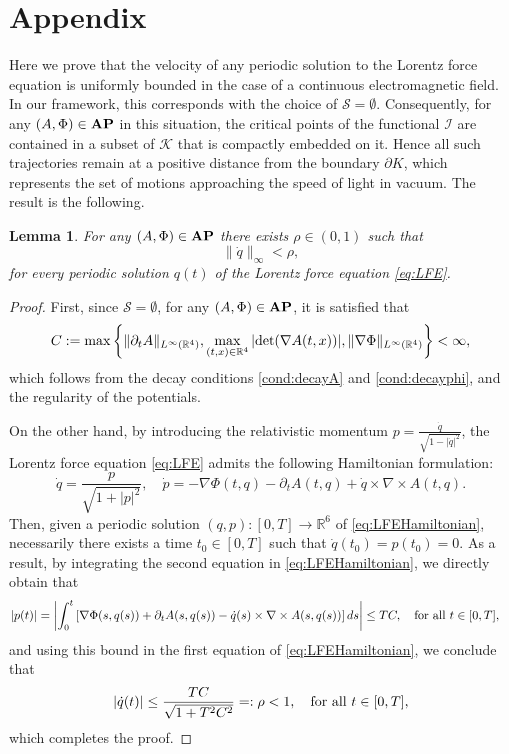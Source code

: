 \documentclass{article}
\newcommand{\boK}{\mathcal{K}}
\newcommand{\boI}{\mathcal{I}}
\newcommand{\R}{\mathbb{R}}
\newcommand{\boS}{\mathcal{S}}
\newcommand{\dq}{\dot{q}}
\newcommand{\dpp}{\dot{p}}
\newcommand{\AP}{\textnormal{\textbf{AP}}}
\newtheorem{lemma}{Lemma}[section]
\theoremstyle{definition}
\begin{document}
\appendix
\section{Appendix}\label{appendix-lemma}
Here we prove that the velocity of any periodic solution to the Lorentz force equation is uniformly bounded in the case of a continuous electromagnetic field. In our framework, this corresponds with the choice of $\boS=\emptyset$. Consequently, for any $(A,\Phi)\in\AP$ in this situation, the critical points of the functional $\boI$ are contained in a subset of $\boK$ that is compactly embedded on it. Hence all such trajectories remain at a positive distance from the boundary $\partial K$, which represents the set of motions approaching the speed of light in vacuum. The result is the following.
\begin{lemma}\label{lemma:uniformbound}
	For any $(A,\Phi)\in\AP$ there exists $\rho\in(0,1)$ such that 
	\begin{equation}\label{def:setKo}
		\|\dq\|_\infty< \rho,
	\end{equation}
    for every periodic solution $q(t)$ of the Lorentz force equation \eqref{eq:LFE}.
\end{lemma}
\begin{proof}
    First, since $\boS=\emptyset$, for any $(A,\Phi)\in\AP$, it is satisfied that
    \begin{equation}
        C:=\max\left\{\|\partial_t A\|_{L^\infty(\R^4)}, \max\limits_{(t,x)\in\R^4}|\textnormal{det}(\nabla A(t,x))|, \|\nabla\Phi\|_{L^\infty(\R^4)}\right\}<\infty,
    \end{equation}which follows from the decay conditions \eqref{cond:decayA} and \eqref{cond:decayphi}, and the regularity of the potentials.
    
   On the other hand, by introducing the relativistic momentum $p=\tfrac{\dq}{\sqrt{1-|\dq|^2}}$, the Lorentz force equation \eqref{eq:LFE} admits the following Hamiltonian formulation:
\begin{equation}\label{eq:LFEHamiltonian}
        \dq=\dfrac{p}{\sqrt{1+|p|^2}}, \quad
        \dpp=-\nabla\Phi(t,q)-\partial_t A(t,q)+\dq\times \nabla\times A(t,q). 
\end{equation}
Then, given a periodic solution $(q,p):[0,T]\to\R^6$ of \eqref{eq:LFEHamiltonian}, necessarily there exists a time $t_0\in[0,T]$ such that $\dq(t_0)=p(t_0)=0$. As a result, by integrating the second equation in \eqref{eq:LFEHamiltonian}, we directly obtain that
\begin{align*}
    |p(t)|&=\left|\int_0^t\left[\nabla\Phi(s,q(s))+\partial_t A(s,q(s))-\dq(s)\times \nabla\times A(s,q(s))\right]ds\right|\leq TC, \quad\hbox{for all }t\in[0,T],
\end{align*}
and using this bound in the first equation of \eqref{eq:LFEHamiltonian}, we conclude that
\begin{equation}
    |\dq(t)|\leq \dfrac{TC}{\sqrt{1+T^2C^2}} =:\rho<1,\quad\hbox{for all }t\in[0,T],
\end{equation}
which completes the proof.
\end{proof}
\end{document}
